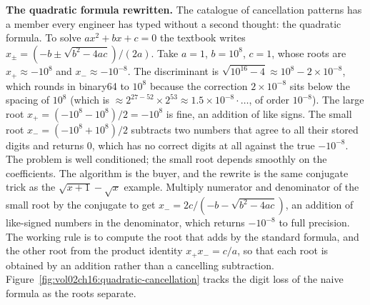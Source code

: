 \begin{example}
\textbf{The quadratic formula rewritten.} The catalogue of cancellation
patterns has a member every engineer has typed without a second thought: the
quadratic formula. To solve $a x^{2} + b x + c = 0$ the textbook writes
$x_{\pm} = (-b \pm \sqrt{b^{2} - 4 a c})/(2 a)$. Take $a = 1$, $b = 10^{8}$,
$c = 1$, whose roots are $x_{+} \approx -10^{8}$ and $x_{-} \approx -10^{-8}$.
The discriminant is $\sqrt{10^{16} - 4} \approx 10^{8} - 2 \times 10^{-8}$,
which rounds in binary64 to $10^{8}$ because the correction $2 \times 10^{-8}$
sits below the spacing of $10^{8}$ (which is $\approx 2^{27 - 52} \times 2^{53}
\approx 1.5 \times 10^{-8} \cdot \ldots$, of order $10^{-8}$). The large root
$x_{+} = (-10^{8} - 10^{8})/2 = -10^{8}$ is fine, an addition of like signs.
The small root $x_{-} = (-10^{8} + 10^{8})/2$ subtracts two numbers that agree
to all their stored digits and returns $0$, which has no correct digits at all
against the true $-10^{-8}$. The problem is well conditioned; the small root
depends smoothly on the coefficients. The algorithm is the buyer, and the
rewrite is the same conjugate trick as the $\sqrt{x+1} - \sqrt{x}$ example.
Multiply numerator and denominator of the small root by the conjugate to get
$x_{-} = 2c/(-b - \sqrt{b^{2} - 4 a c})$, an addition of like-signed numbers
in the denominator, which returns $-10^{-8}$ to full precision. The working
rule is to compute the root that adds by the standard formula, and the other
root from the product identity $x_{+} x_{-} = c/a$, so that each root is
obtained by an addition rather than a cancelling subtraction.
Figure~\ref{fig:vol02ch16:quadratic-cancellation} tracks the digit loss of the
naive formula as the roots separate.
\end{example}



